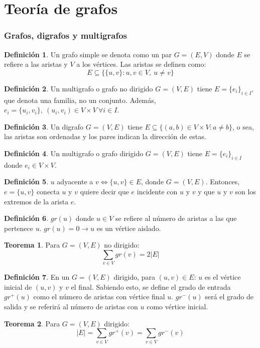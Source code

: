 \documentclass[10pt,a4paper]{article}
\theoremstyle{definition}
\newtheorem{definition}{Definición}[section]
\newtheorem{theorem}{Teorema}[section]
\begin{document}
\part{Teoría de grafos}
\section{Grafos, digrafos y multigrafos}
\begin{definition}
	Un grafo simple se denota como un par $G=(E,V)$ donde $E$ se refiere a las aristas y $V$ a los vértices. Las aristas se definen como:
	\[E\subseteq\{\{u,v\}: u,v\in V,\: u\neq v\}\]
\end{definition}
\begin{definition}
	Un multigrafo o grafo no dirigido $G=(V,E)$ tiene $E = \{e_i\}_{i\in I}$, que denota una familia, no un conjunto. Además, $e_i = \{u_i,v_i\},\:(u_i, v_i)\in V\times V\:\forall i\in I$. 
\end{definition}
\begin{definition}
	Un digrafo $G=(V,E)$ tiene $E\subseteq \{(a,b)\in V\times V : a\neq b\}$, o sea, las aristas son ordenadas y los pares indican la dirección de estas.
\end{definition}
\begin{definition}
Un multigrafo o grafo dirigido $G=(V,E)$ tiene $E=\{e_i\}_{i\in I}$ donde $e_i\in V\times V$.
\end{definition}
\begin{definition}
$u$ adyacente a $v \iff \{u,v\}\in E$, donde $G=(V,E)$. Entonces, $e=\{u,v\}$ conecta $u$ y $v$ quiere decir que $e$ incidente con $u$ y $v$ y que $u$ y $v$ son los extremos de la arista $e$.
\end{definition}
\begin{definition}
	$gr(u)$ donde $u\in V$ se refiere al número de aristas a las que pertenece $u$. $gr(u) = 0 \longrightarrow u$ es un vértice aislado.
\end{definition}
\begin{theorem} Para $G=(V,E)$ no dirigido: 
	\[\sum_{v\in V}gr(v) = 2|E|\]
\end{theorem}
\begin{definition}
	En un $G=(V,E)$ dirigido, para $(u,v)\in E$: $u$ es el vértice inicial de $(u,v)$ y $v$ el final. Sabiendo esto, se define el grado de entrada $gr^+(u)$ como el número de aristas con vértice final $u$. $gr^-(u)$ será el grado de salida y se referirá al número de aristas con $u$ como vértice inicial.
\end{definition}
\begin{theorem}
	Para $G=(V,E)$ dirigido:
	\[|E| = \sum_{v\in V}gr^+(v) = \sum_{v\in V}gr^-(v)\]
\end{theorem}
\end{document}
